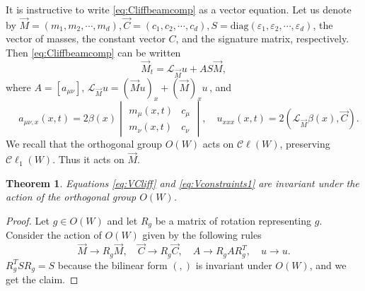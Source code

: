 \documentclass[10pt,a4paper]{article}
\numberwithin{equation}{section}
\theoremstyle{plain}
\newtheorem{theorem}{Theorem}[section]
\theoremstyle{definition}
\renewcommand{\epsilon}{\varepsilon}
\newcommand\Cl{\mathcal{C}\ell}
\begin{document}
It is instructive to write \autoref{eq:Cliffbeamcomp} as a vector equation.  
Let us denote by $\vec{M}=(m_1, m_2, \cdots, m_d), \vec{C}=(c_1, c_2, \cdots, c_d), S=\text{diag}(\epsilon_1, \epsilon_2, \cdots, \epsilon_d)$, the vector of masses, the constant vector $C$, and the signature matrix, respectively.  Then \autoref{eq:Cliffbeamcomp} can be written
\begin{equation} \label{eq:VCliff}
\vec{M}_t=\mathcal{L}_{\vec{M}} u+AS\vec{M}, 
\end{equation} 
where $A=[a_{\mu \nu}], \, \mathcal{L}_{\vec{M}}u=(\vec{M}u)_x+(\vec{M})_x u\, $,  and 
\begin{equation} \label{eq:Vconstraints1} 
\quad a_{\mu\nu,x}(x,t)=2\beta(x)\begin{vmatrix}m_\mu(x,t)&c_\mu\\ m_\nu(x,t)&c_\nu \end{vmatrix}, \quad u_{xxx}(x,t)=2(\mathcal{L}_{\vec{M}} \beta(x), \vec{C}).  
\end{equation}
We recall that the orthogonal group $O(W)$ acts on $\Cl(W)$, preserving $\Cl_1(W)$.  Thus 
it acts on $\vec{M}$.  

\begin{theorem} 
Equations \eqref{eq:VCliff} and \eqref{eq:Vconstraints1} are invariant under the action of 
the orthogonal group $O(W)$.  
\end{theorem} 
\begin{proof} Let $g\in O(W)$ and let $R_g$ be a matrix of rotation representing $g$.  
 Consider the action of $O(W)$ given by the following rules
\begin{equation*} 
\vec{M}\rightarrow  R_g\vec{M}, \quad 
\vec{C}\rightarrow R_g\vec{C}, \quad 
A\rightarrow R_gAR_g^T, \quad 
u\rightarrow u.  
\end{equation*} 
$R_g^T S R_g=S$ because the bilinear form $(,)$ is invariant under $O(W)$, and we get the claim.  
\end{proof} 
\end{document}
